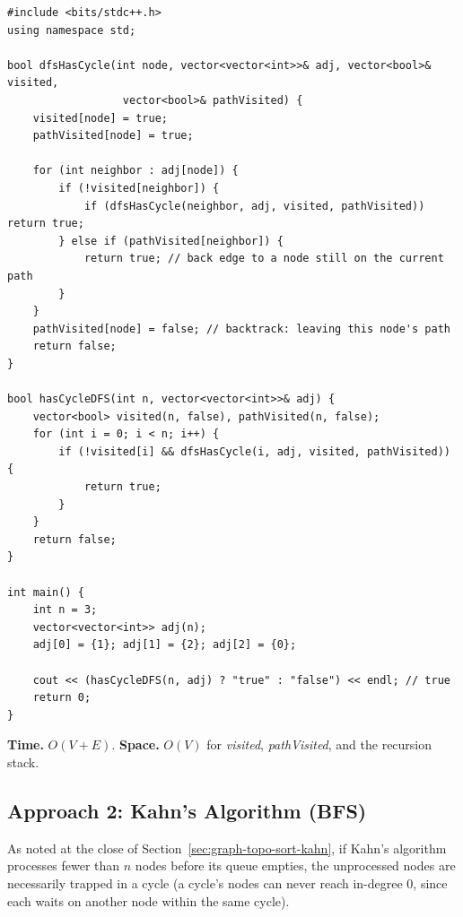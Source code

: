 \begin{lstlisting}
#include <bits/stdc++.h>
using namespace std;

bool dfsHasCycle(int node, vector<vector<int>>& adj, vector<bool>& visited,
                  vector<bool>& pathVisited) {
    visited[node] = true;
    pathVisited[node] = true;

    for (int neighbor : adj[node]) {
        if (!visited[neighbor]) {
            if (dfsHasCycle(neighbor, adj, visited, pathVisited)) return true;
        } else if (pathVisited[neighbor]) {
            return true; // back edge to a node still on the current path
        }
    }
    pathVisited[node] = false; // backtrack: leaving this node's path
    return false;
}

bool hasCycleDFS(int n, vector<vector<int>>& adj) {
    vector<bool> visited(n, false), pathVisited(n, false);
    for (int i = 0; i < n; i++) {
        if (!visited[i] && dfsHasCycle(i, adj, visited, pathVisited)) {
            return true;
        }
    }
    return false;
}

int main() {
    int n = 3;
    vector<vector<int>> adj(n);
    adj[0] = {1}; adj[1] = {2}; adj[2] = {0};

    cout << (hasCycleDFS(n, adj) ? "true" : "false") << endl; // true
    return 0;
}
\end{lstlisting}

\begin{complexitybox}
\textbf{Time.} $O(V+E)$.
\textbf{Space.} $O(V)$ for \textit{visited}, \textit{pathVisited}, and
the recursion stack.
\end{complexitybox}

\subsection*{Approach 2: Kahn's Algorithm (BFS)}

As noted at the close of Section~\ref{sec:graph-topo-sort-kahn}, if
Kahn's algorithm processes fewer than $n$ nodes before its queue
empties, the unprocessed nodes are necessarily trapped in a cycle (a
cycle's nodes can never reach in-degree $0$, since each waits on
another node within the same cycle).

